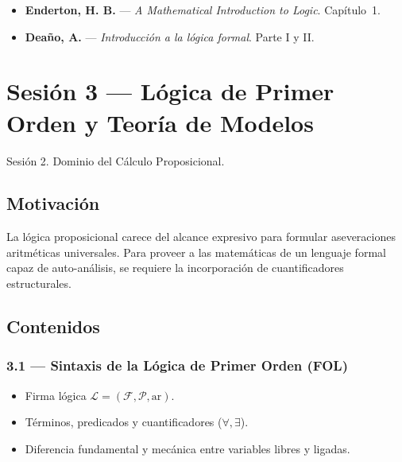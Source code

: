 \documentclass[11pt, letterpaper]{article}
\begin{document}
\begin{lecturas}
\begin{itemize}
  \item[$(\star)$] \textbf{Enderton, H. B.} --- \emph{A Mathematical Introduction to Logic}. Cap\'itulo~1.
  \item \textbf{Deaño, A.} --- \emph{Introducci\'on a la l\'ogica formal}. Parte I y II.
\end{itemize}
\end{lecturas}

\newpage

\section{Sesi\'on 3 --- L\'ogica de Primer Orden y Teor\'ia de Modelos}

\begin{prereqs}
Sesi\'on 2. Dominio del C\'alculo Proposicional.
\end{prereqs}

\subsection*{Motivaci\'on}
La l\'ogica proposicional carece del alcance expresivo para formular aseveraciones aritm\'eticas universales. Para proveer a las matem\'aticas de un lenguaje formal capaz de auto-an\'alisis, se requiere la incorporaci\'on de cuantificadores estructurales.

\subsection{Contenidos}

\subsubsection{3.1 --- Sintaxis de la L\'ogica de Primer Orden (FOL)}
\begin{itemize}
  \item Firma l\'ogica $\mathcal{L}=(\mathcal{F},\mathcal{P},\text{ar})$.
  \item T\'erminos, predicados y cuantificadores ($\forall, \exists$). 
  \item Diferencia fundamental y mec\'anica entre variables libres y ligadas.
\end{itemize}
\end{document}
